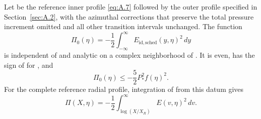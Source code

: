 \begin{lemma}\label{lem:A.5}
Let  be the reference inner profile \eqref{eq:A.7}
followed by the outer profile  specified in Section~\ref{sec:A.2}, with
the azimuthal corrections that preserve the total pressure increment omitted and all other
transition intervals unchanged. The function
\begin{equation}
 \Pi_0(\eta)=-\frac12\int_{-\infty}^{\infty}
 E_{\mathrm{id,sched}}(y,\eta)^2\,dy
 \tag{A.21}\label{eq:A.21}
\end{equation}
is independent of  and analytic on a complex neighborhood of
. It is even,  has the sign
of  for , and
\begin{equation}
 \Pi_0(\eta)\leq-\frac52P_*^2f(\eta)^2.
 \tag{A.22}\label{eq:A.22}
\end{equation}
For the complete reference radial profile, integration of
 from this datum gives
\begin{equation}
 \Pi(X,\eta)=-\frac12\int_{\log(X/X_R)}^\infty E(v,\eta)^2\,dv.
 \tag{A.23}\label{eq:A.23}
\end{equation}
\end{lemma}
